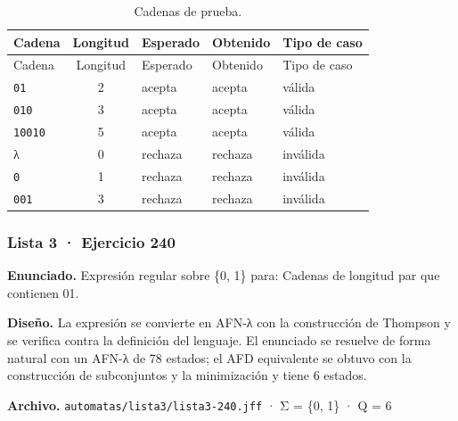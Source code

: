 \begin{longtable}[]{@{}lclll@{}}
\caption{Cadenas de prueba.}\tabularnewline
\toprule\noalign{}
Cadena & Longitud & Esperado & Obtenido & Tipo de caso \\
\midrule\noalign{}
\endfirsthead
\toprule\noalign{}
Cadena & Longitud & Esperado & Obtenido & Tipo de caso \\
\midrule\noalign{}
\endhead
\bottomrule\noalign{}
\endlastfoot
\texttt{01} & 2 & acepta & acepta & válida \\
\texttt{010} & 3 & acepta & acepta & válida \\
\texttt{10010} & 5 & acepta & acepta & válida \\
λ & 0 & rechaza & rechaza & inválida \\
\texttt{0} & 1 & rechaza & rechaza & inválida \\
\texttt{001} & 3 & rechaza & rechaza & inválida \\
\end{longtable}


\hypertarget{lista-3-ejercicio-240}{%
\subsubsection{Lista 3 · Ejercicio 240}\label{lista-3-ejercicio-240}}

\textbf{Enunciado.} Expresión regular sobre \{0, 1\} para: Cadenas de longitud par que contienen 01.

\textbf{Diseño.} La expresión se convierte en AFN-λ con la construcción de Thompson y se verifica contra la definición del lenguaje. El enunciado se resuelve de forma natural con un AFN-λ de 78 estados; el AFD equivalente se obtuvo con la construcción de subconjuntos y la minimización y tiene 6 estados.

\textbf{Archivo.} \texttt{automatas/lista3/lista3-240.jff} · Σ = \{0, 1\} · \textbar Q\textbar{} = 6

